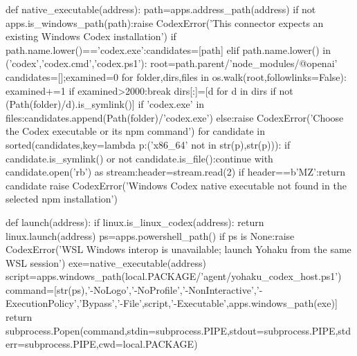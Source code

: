 def native_executable(address):
    path=apps.address_path(address)
    if not apps.is_windows_path(path):raise CodexError('This connector expects an existing Windows Codex installation')
    if path.name.lower()=='codex.exe':candidates=[path]
    elif path.name.lower() in ('codex','codex.cmd','codex.ps1'):
        root=path.parent/'node_modules/@openai'
        candidates=[];examined=0
        for folder,dirs,files in os.walk(root,followlinks=False):
            examined+=1
            if examined>2000:break
            dirs[:]=[d for d in dirs if not (Path(folder)/d).is_symlink()]
            if 'codex.exe' in files:candidates.append(Path(folder)/'codex.exe')
    else:raise CodexError('Choose the Codex executable or its npm command')
    for candidate in sorted(candidates,key=lambda p:('x86_64' not in str(p),str(p))):
        if candidate.is_symlink() or not candidate.is_file():continue
        with candidate.open('rb') as stream:header=stream.read(2)
        if header==b'MZ':return candidate
    raise CodexError('Windows Codex native executable not found in the selected npm installation')

def launch(address):
    if linux.is_linux_codex(address):
        return linux.launch(address)
    ps=apps.powershell_path()
    if ps is None:raise CodexError('WSL Windows interop is unavailable; launch Yohaku from the same WSL session')
    exe=native_executable(address)
    script=apps.windows_path(local.PACKAGE/'agent/yohaku_codex_host.ps1')
    command=[str(ps),'-NoLogo','-NoProfile','-NonInteractive','-ExecutionPolicy','Bypass','-File',script,'-Executable',apps.windows_path(exe)]
    return subprocess.Popen(command,stdin=subprocess.PIPE,stdout=subprocess.PIPE,stderr=subprocess.PIPE,cwd=local.PACKAGE)

